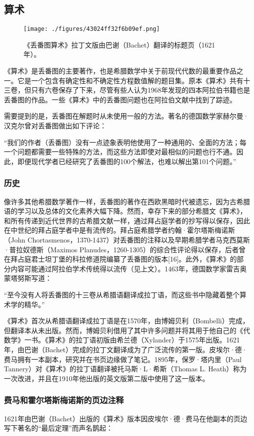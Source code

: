 \subsection{算术}
\begin{figure}[ht]
\centering
\texttt{[image: ./figures/43024ff32f6b09ef.png]}
\caption{《丢番图算术》拉丁文版由巴谢（Bachet）翻译的标题页（1621年）。} \label{fig_DPHT_1}
\end{figure}
《算术》是丢番图的主要著作，也是希腊数学中关于前现代代数的最重要作品之一。它是一个包含有确定性和不确定性方程数值解的题目集。原本《算术》共有十三卷，但只有六卷保存了下来，尽管有些人认为1968年发现的四本阿拉伯书籍也是丢番图的作品。一些《算术》中的丢番图问题也在阿拉伯文献中找到了踪迹。

需要提到的是，丢番图在解题时从未使用一般的方法。著名的德国数学家赫尔曼·汉克尔曾对丢番图做出如下评论：

“我们的作者（丢番图）没有一点迹象表明他使用了一种通用的、全面的方法；每一个问题都需要一些特殊的方法，而这些方法即使对最相似的问题也行不通。因此，即便现代学者已经研究了丢番图的100个解法，也难以解出第101个问题。”
\subsubsection{历史}
像许多其他希腊数学著作一样，丢番图的著作在西欧黑暗时代被遗忘，因为古希腊语的学习以及总体的文化素养大幅下降。然而，幸存下来的部分希腊文《算术》，和所有传递到近代世界的古希腊文献一样，通过拜占庭学者的抄写得以保存，因此在中世纪的拜占庭学者中是有流传的。拜占庭希腊学者约翰·霍尔塔斯梅诺斯（John Chortasmenos，1370-1437）对丢番图的注释以及早期希腊学者马克西莫斯·普拉奴德斯（Maximos Planudes，1260-1305）的综合性评论得以保存，后者曾在拜占庭君士坦丁堡的科拉修道院编纂了丢番图的版本[16]。此外，《算术》的部分内容可能通过阿拉伯学术传统得以流传（见上文）。1463年，德国数学家雷吉奥蒙塔努斯写道：

“至今没有人将丢番图的十三卷从希腊语翻译成拉丁语，而这些书中隐藏着整个算术学的精华。”

《算术》首次从希腊语翻译成拉丁语是在1570年，由博姆贝利（Bombelli）完成，但翻译本从未出版。然而，博姆贝利借用了其中许多问题并将其用于他自己的《代数学》一书。《算术》的拉丁语初版由希兰德（Xylander）于1575年出版。1621年，由巴谢（Bachet）完成的拉丁文翻译成为了广泛流传的第一版。皮埃尔·德·费马拥有一本副本，研究并在书页边缘做了笔记。1895年，保罗·塔内里（Paul Tannery）对《算术》的拉丁语翻译被托马斯·L·希斯（Thomas L. Heath）称为一次改进，并且在1910年他出版的英文版第二版中使用了这一版本。
\subsubsection{费马和霍尔塔斯梅诺斯的页边注释}
1621年由巴谢（Bachet）出版的《算术》版本因皮埃尔·德·费马在他副本的页边写下著名的“最后定理”而声名鹊起：

